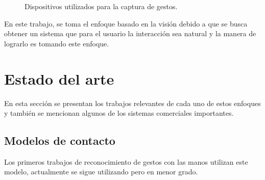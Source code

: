 \begin{figure}[h!]
\begin{center}
{    \label{fig:Modelos:2} 
}
\caption{Dispositivos utilizados para la captura de gestos.} 
\label{fig:Modelos} 
\end{center}
\end{figure} 

En este trabajo, se toma el enfoque basado en la visión debido a que se busca obtener un sistema que para el usuario la interacción sea natural y la manera de lograrlo es tomando este enfoque.  

 





\section{Estado del arte}\label{sec:EstadoDelArte} 

En esta sección se presentan los trabajos relevantes de cada uno de estos enfoques y también se mencionan algunos de los sistemas comerciales importantes. 

\subsection{Modelos de contacto}
 
Los primeros trabajos de reconocimiento de gestos con las manos utilizan este modelo, actualmente se sigue utilizando pero en menor grado. 

